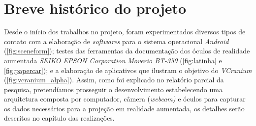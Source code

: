 \section{Breve histórico do projeto}

Desde o início dos trabalhos no projeto, foram experimentados diversos tipos de contato com a elaboração de \textit{softwares} para o sistema operacional \textit{Android} (\ref{fig:sceneform}); testes das ferramentas da documentação dos óculos de realidade aumentada \textit{SEIKO EPSON Corporation\texttrademark} \textit{Moverio BT-350} (\ref{fig:latinha} e \ref{fig:papercar}); e a elaboração de aplicativos que ilustram o objetivo do \textit{VCranium} (\ref{fig:vcranium_alpha}). Assim, como foi explicado no relatório parcial da pesquisa, pretendíamos prosseguir o desenvolvimento estabelecendo uma arquitetura composta por computador, câmera (\textit{webcam)} e óculos para capturar os dados necessários para a projeção em realidade aumentada, os detalhes serão descritos no capítulo das realizações.

